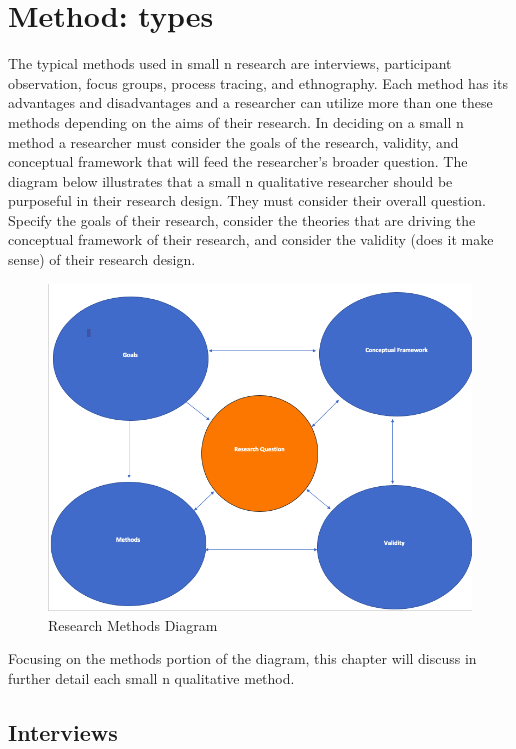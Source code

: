 \documentclass{book}
\begin{document}
\hypertarget{method-types}{%
\section{Method: types}\label{method-types}}

The typical methods used in small n research are interviews, participant
observation, focus groups, process tracing, and ethnography. Each method has
its advantages and disadvantages and a researcher can utilize more than one
these methods depending on the aims of their research. In deciding on a small
n method a researcher must consider the goals of the research, validity, and
conceptual framework that will feed the researcher's broader question. The
diagram below illustrates that a small n qualitative researcher should be
purposeful in their research design. They must consider their overall
question. Specify the goals of their research, consider the theories that are
driving the conceptual framework of their research, and consider the validity
(does it make sense) of their research design.

\begin{figure}
\hypertarget{fig:questiondiagram}{%
\centering
\includegraphics{images/questiondiagram.png}
\caption{Research Methods Diagram}\label{fig:questiondiagram}
}
\end{figure}

Focusing on the methods portion of the diagram, this chapter will discuss in
further detail each small n qualitative method.

\hypertarget{interviews}{%
\subsection{Interviews}\label{interviews}}
\end{document}
